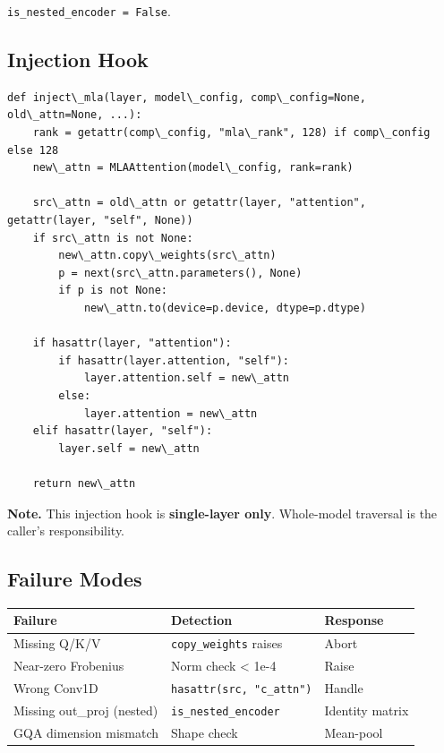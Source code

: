 \texttt{is\_nested\_encoder = False}.

\subsection{Injection Hook}

\begin{lstlisting}
def inject\_mla(layer, model\_config, comp\_config=None, old\_attn=None, ...):
    rank = getattr(comp\_config, "mla\_rank", 128) if comp\_config else 128
    new\_attn = MLAAttention(model\_config, rank=rank)
    
    src\_attn = old\_attn or getattr(layer, "attention", getattr(layer, "self", None))
    if src\_attn is not None:
        new\_attn.copy\_weights(src\_attn)
        p = next(src\_attn.parameters(), None)
        if p is not None:
            new\_attn.to(device=p.device, dtype=p.dtype)
    
    if hasattr(layer, "attention"):
        if hasattr(layer.attention, "self"):
            layer.attention.self = new\_attn
        else:
            layer.attention = new\_attn
    elif hasattr(layer, "self"):
        layer.self = new\_attn
    
    return new\_attn
\end{lstlisting}

\textbf{Note.} This injection hook is \textbf{single-layer only}. Whole-model traversal 
is the caller's responsibility.

\subsection{Failure Modes}

\begin{table}[H]
\centering
\small
\begin{tabular}{lll}
\toprule
\textbf{Failure} & \textbf{Detection} & \textbf{Response} \\
\midrule
Missing Q/K/V & \texttt{copy\_weights} raises & Abort \\
Near-zero Frobenius & Norm check \textless{} 1e-4 & Raise \\
Wrong Conv1D & \texttt{hasattr(src, "c\_attn")} & Handle \\
Missing out\_proj (nested) & \texttt{is\_nested\_encoder} & Identity matrix \\
GQA dimension mismatch & Shape check & Mean-pool \\
\bottomrule
\end{tabular}
\end{table}


